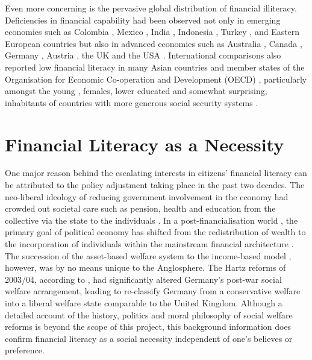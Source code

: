 \documentclass[a4paper,11pt,UKenglish,twoside,openright]{report}\usepackage[]{graphicx}\usepackage[]{color}
\begin{document}
Even more concerning is the pervasive global distribution of financial illiteracy. Deficiencies in financial capability had been observed not only in emerging economies \parencite{karakurumozdemir:2019} such as Colombia \parencite{caoalvira:2020}, Mexico \parencite{arceogomez:2017, bohm:2021}, India \parencite{agarwal:2015b, kiliyanni:2016, utkarsh:2020}, Indonesia \parencite{cole:2009, khoirunnisaa:2020}, Turkey \parencite{akbenselcuk:2014}, and Eastern European countries \parencite{belas:2016, opletalova:2015, reiter:2020} but also in advanced economies such as Australia \parencite{ali:2014, taylor:2013, thomson:2017}, Canada \parencite{boisclair:2017}, Germany \parencite{bucherkoenen:2017, erner:2016}, Austria \parencite{silgoner:2015}, the UK \parencite{barnard:2021} and the USA \parencite{breitbach:2016, gale:2012, lusardi:2010}. International comparisons also reported low financial literacy in many Asian countries \parencite{yoshino:2015} and member states of the Organisation for Economic Co-operation and Development (OECD) \parencite{cupak:2018a, lusardi:2015a}, particularly amongst the young \parencite{debeckker:2019}, females, lower educated \parencite{klapper:2019} and somewhat surprising, inhabitants of countries with more generous social security systems \parencite{jappelli:2010}.

\section{Financial Literacy as a Necessity}

One major reason behind the escalating interests in citizens' financial literacy can be attributed to the policy adjustment taking place in the past two decades. The neo-liberal ideology of reducing government involvement in the economy had crowded out societal care such as pension, health and education from the collective via the state to the individuals \parencite{gilbert:2002}. In a post-financialisation world \parencite{krippner:2005}, the primary goal of political economy has shifted from the redistribution of wealth to the incorporation of individuals within the mainstream financial architecture \parencite{regan:2003}. The succession of the asset-based welfare system to the income-based model \parencite{finlayson:2009}, however, was by no means unique to the Anglosphere. The Hartz reforms of 2003/04, according to \textcite{seeleibkaiser:2016}, had significantly altered Germany's post-war social welfare arrangement, leading \textcite{ferragina:2015} to re-classify Germany from a conservative welfare into a liberal welfare state comparable to the United Kingdom. Although a detailed account of the history, politics and moral philosophy of social welfare reforms is beyond the scope of this project, this background information does confirm financial literacy as a social necessity independent of one's believes or preference.
\end{document}
